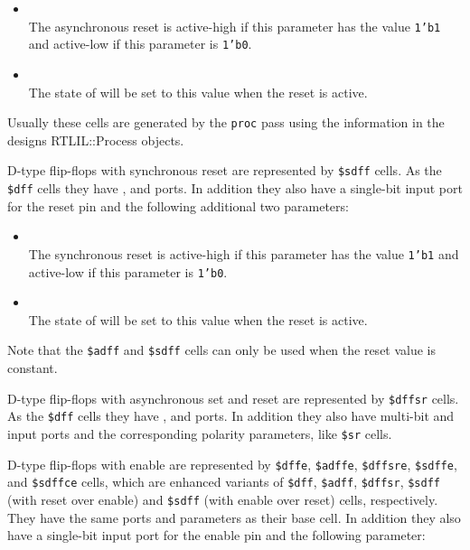 \begin{itemize}
\item {} \\
The asynchronous reset is active-high if this parameter has the value {\tt 1'b1} and active-low
if this parameter is {\tt 1'b0}.

\item {} \\
The state of  will be set to this value when the reset is active.
\end{itemize}

\begin{sloppypar}
Usually these cells are generated by the {\tt proc} pass using the information
in the designs RTLIL::Process objects.
\end{sloppypar}

D-type flip-flops with synchronous reset are represented by {\tt \$sdff} cells. As the {\tt \$dff}
cells they have ,  and  ports. In addition they also have a single-bit 
input port for the reset pin and the following additional two parameters:

\begin{itemize}
\item {} \\
The synchronous reset is active-high if this parameter has the value {\tt 1'b1} and active-low
if this parameter is {\tt 1'b0}.

\item {} \\
The state of  will be set to this value when the reset is active.
\end{itemize}

Note that the {\tt \$adff} and {\tt \$sdff} cells can only be used when the reset value is constant.

D-type flip-flops with asynchronous set and reset are represented by {\tt \$dffsr} cells.
As the {\tt \$dff} cells they have ,  and  ports. In addition they also have
multi-bit  and  input ports and the corresponding polarity parameters, like 
{\tt \$sr} cells.

D-type flip-flops with enable are represented by {\tt \$dffe}, {\tt \$adffe}, {\tt \$dffsre},
{\tt \$sdffe}, and {\tt \$sdffce} cells, which are enhanced variants of {\tt \$dff}, {\tt \$adff}, {\tt \$dffsr},
{\tt \$sdff} (with reset over enable) and {\tt \$sdff} (with enable over reset)
cells, respectively.  They have the same ports and parameters as their base cell.
In addition they also have a single-bit  input port for the enable pin and the following parameter:

